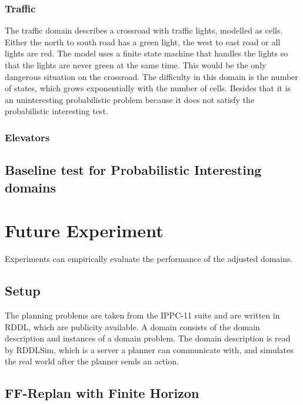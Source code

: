 \documentclass[runningheads,a4paper]{llncs}
\begin{document}
\subsubsection{Traffic}

The traffic domain describes a crossroad with traffic lights, modelled as
cells. Either the north to south road has a green light, the west to east road
or all lights are red. The model uses a finite state machine that handles the
lights so that the lights are never green at the same time. This would be the
only dangerous situation on the crossroad. The difficulty in this domain is
the number of states, which grows exponentially with the number of cells.
Besides that it is an uninteresting probabilistic problem because it does
not satisfy the probabilistic interesting test.

\subsubsection{Elevators}



\subsection{Baseline test for Probabilistic Interesting domains}


\section{Future Experiment}
\label{sec:experiment}

Experiments can empirically evaluate the performance of the adjusted domains.

\subsection{Setup}

The planning problems are taken from the IPPC-11 suite and are written in RDDL,
which are publicity available. A domain consists of the domain description and
instances of a domain problem. The domain description is read by RDDLSim, which
is a server a planner can communicate with, and simulates the real world after
the planner sends an action.

\subsection{FF-Replan with Finite Horizon}
\end{document}
